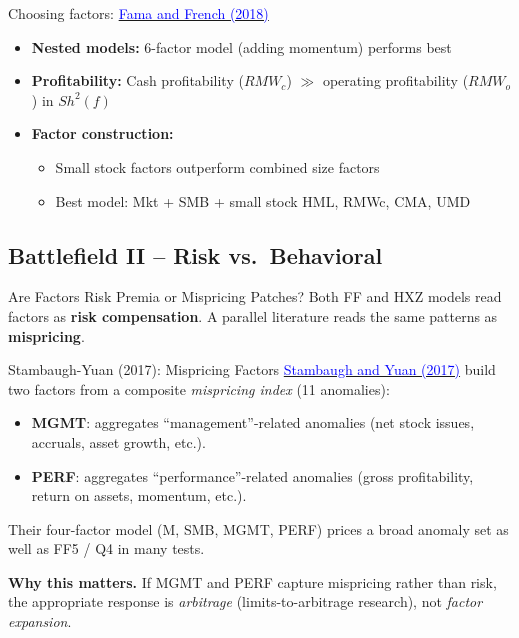 \documentclass{beamer}
\begin{document}
\begin{frame}{Choosing factors: \href{https://doi.org/10.1016/j.jfineco.2018.02.012}{\textcolor{blue}{Fama and French (2018)}}}
\begin{itemize}
\item \textbf{Nested models:} 6-factor model (adding momentum) performs best
\item \textbf{Profitability:} Cash profitability ($RMW_c$) $\gg$ operating profitability ($RMW_o$) in $Sh^2 (f)$
\item \textbf{Factor construction:}
\begin{itemize}
\item Small stock factors outperform combined size factors
\item Best model: Mkt + SMB + small stock HML, RMWc, CMA, UMD
\end{itemize}
\end{itemize}
\end{frame}


\subsection{Battlefield II -- Risk vs.\ Behavioral}

\begin{frame}{Are Factors Risk Premia or Mispricing Patches?}
	Both FF and HXZ models read factors as \textbf{risk compensation}. A parallel literature reads the same patterns as \textbf{mispricing}.
	\vspace{4pt}
	\begin{block}{Stambaugh-Yuan (2017): Mispricing Factors}
		\href{https://doi.org/10.1093/rfs/hhw107}{\textcolor{blue}{Stambaugh and Yuan (2017)}} build two factors from a composite \textit{mispricing index} (11 anomalies):
		\begin{itemize}
			\item \textbf{MGMT}: aggregates ``management''-related anomalies (net stock issues, accruals, asset growth, etc.).
			\item \textbf{PERF}: aggregates ``performance''-related anomalies (gross profitability, return on assets, momentum, etc.).
		\end{itemize}
		Their four-factor model (M, SMB, MGMT, PERF) prices a broad anomaly set as well as FF5 / Q4 in many tests.
	\end{block}
	\textbf{Why this matters.} If MGMT and PERF capture mispricing rather than risk, the appropriate response is \textit{arbitrage} (limits-to-arbitrage research), not \textit{factor expansion}.
\end{frame}
\end{document}
